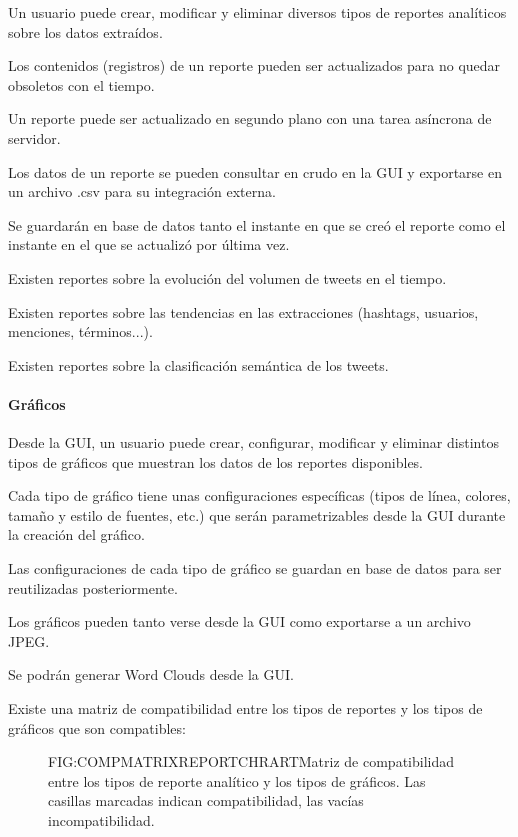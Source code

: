 \begin{functional}
\item Un usuario puede crear, modificar y eliminar diversos tipos de reportes analíticos sobre los datos extraídos.
\item Los contenidos (registros) de un reporte pueden ser actualizados para no quedar obsoletos con el tiempo.
\item Un reporte puede ser actualizado en segundo plano con una tarea asíncrona de servidor.
\item Los datos de un reporte se pueden consultar en crudo en la GUI y exportarse en un archivo .csv para su integración externa.
\item Se guardarán en base de datos tanto el instante en que se creó el reporte como el instante en el que se actualizó por última vez.
\item Existen reportes sobre la evolución del volumen de tweets en el tiempo. 
\item Existen reportes sobre las tendencias en las extracciones (hashtags, usuarios, menciones, términos...).
\item Existen reportes sobre la clasificación semántica de los tweets.
\newpage
\paragraph{Gráficos}
\item Desde la GUI, un usuario puede crear, configurar, modificar y eliminar distintos tipos de gráficos que muestran los datos de los reportes disponibles.
\item Cada tipo de gráfico tiene unas configuraciones específicas (tipos de línea, colores, tamaño y estilo de fuentes, etc.) que serán parametrizables desde la GUI durante la creación del gráfico. 
\item Las configuraciones de cada tipo de gráfico se guardan en base de datos para ser reutilizadas posteriormente.
\item Los gráficos pueden tanto verse desde la GUI como exportarse a un archivo JPEG.
\item Se podrán generar Word Clouds desde la GUI.
\item Existe una matriz de compatibilidad entre los tipos de reportes y los tipos de gráficos que son compatibles:
\begin{figure}[Matriz de compatibilidad reporte-gráfico]{FIG:COMPMATRIXREPORTCHRART}{Matriz de compatibilidad entre los tipos de reporte analítico y los tipos de gráficos. Las casillas marcadas indican compatibilidad, las vacías incompatibilidad.}
\end{figure}

\end{functional}
